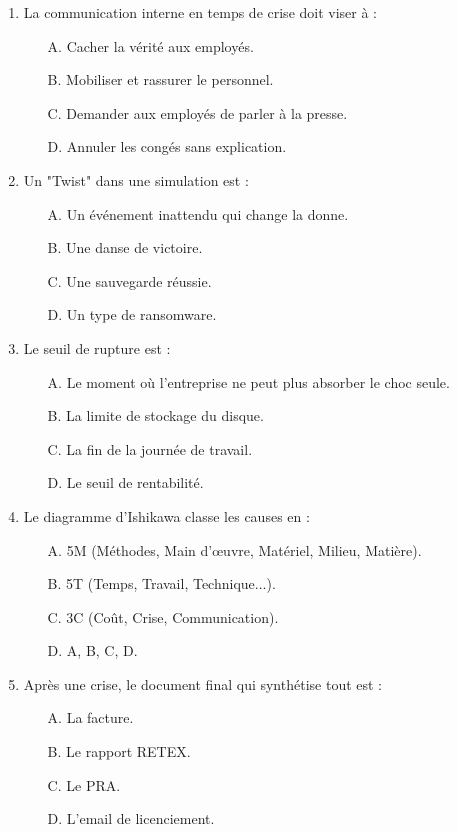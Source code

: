 \begin{enumerate}
    \item La communication interne en temps de crise doit viser à :
    \begin{itemize}
        \item[A.] Cacher la vérité aux employés.
        \item[B.] Mobiliser et rassurer le personnel.
        \item[C.] Demander aux employés de parler à la presse.
        \item[D.] Annuler les congés sans explication.
    \end{itemize}

    \item Un "Twist" dans une simulation est :
    \begin{itemize}
        \item[A.] Un événement inattendu qui change la donne.
        \item[B.] Une danse de victoire.
        \item[C.] Une sauvegarde réussie.
        \item[D.] Un type de ransomware.
    \end{itemize}

    \item Le seuil de rupture est :
    \begin{itemize}
        \item[A.] Le moment où l'entreprise ne peut plus absorber le choc seule.
        \item[B.] La limite de stockage du disque.
        \item[C.] La fin de la journée de travail.
        \item[D.] Le seuil de rentabilité.
    \end{itemize}

    \item Le diagramme d'Ishikawa classe les causes en :
    \begin{itemize}
        \item[A.] 5M (Méthodes, Main d'œuvre, Matériel, Milieu, Matière).
        \item[B.] 5T (Temps, Travail, Technique...).
        \item[C.] 3C (Coût, Crise, Communication).
        \item[D.] A, B, C, D.
    \end{itemize}

    \item Après une crise, le document final qui synthétise tout est :
    \begin{itemize}
        \item[A.] La facture.
        \item[B.] Le rapport RETEX.
        \item[C.] Le PRA.
        \item[D.] L'email de licenciement.
    \end{itemize}
\end{enumerate}


